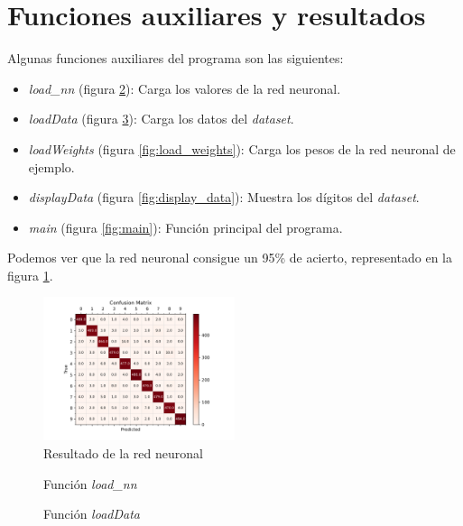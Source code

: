 \documentclass[6pt]{../../shared/AiTex}
\begin{document}
\section{Funciones auxiliares y resultados}

Algunas funciones auxiliares del programa son las siguientes:
\begin{itemize}
    \item \textit{load\_nn} (figura \ref{fig:load_nn}): Carga los valores de la red neuronal.
    \item \textit{loadData} (figura \ref{fig:load_data}): Carga los datos del \textit{dataset}.
    \item \textit{loadWeights} (figura \ref{fig:load_weights}): Carga los pesos de la red neuronal de ejemplo.
    \item \textit{displayData} (figura \ref{fig:display_data}): Muestra los dígitos del \textit{dataset}.
    \item \textit{main} (figura \ref{fig:main}): Función principal del programa.
\end{itemize}

Podemos ver que la red neuronal consigue un 95\% de acierto, representado en la figura \ref{fig:resultado}.

\begin{figure}[H]
    \centering
    \includegraphics[width=0.5\textwidth]{./imagenes/confusion_matrix.png}
    \caption{Resultado de la red neuronal}
    \label{fig:resultado}
\end{figure}

\begin{figure}[H]
    \centering
    
    \caption{Función \textit{load\_nn}}
    \label{fig:load_nn}
\end{figure}

\begin{figure}[H]
    \centering
    
    \caption{Función \textit{loadData}}
    \label{fig:load_data}
\end{figure}
\end{document}
